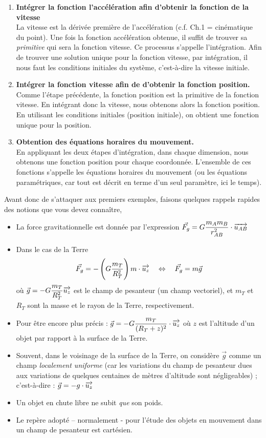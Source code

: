 \documentclass[11pt,a4paper]{article}
\begin{document}
\begin{mdframed}[backgroundcolor=blue!5]
\begin{enumerate}
    \item \textbf{Intégrer la fonction l'accélération afin d'obtenir la fonction de la vitesse}\\
    La vitesse est la dérivée première de l'accélération (c.f. Ch.1 = cinématique du point). Une fois la fonction accélération obtenue, il suffit de trouver sa \textit{primitive} qui sera la fonction vitesse. Ce processus s'appelle l'intégration. Afin de trouver une solution unique pour la fonction vitesse, par intégration, il nous faut les conditions initiales du système, c'est-à-dire la vitesse initiale. 
    \item \textbf{Intégrer la fonction vitesse afin de d'obtenir la fonction position.}\\
    Comme l'étape précédente, la fonction position est la primitive de la fonction vitesse. En intégrant donc la vitesse, nous obtenons alors la fonction position. En utilisant les conditions initiales (position initiale), on obtient une fonction unique pour la position. 
    \item \textbf{Obtention des équations horaires du mouvement. }\\
    En appliquant les deux étapes d'intégration, dans chaque dimension, nous obtenons une fonction position pour chaque coordonnée. L'ensemble de ces fonctions s'appelle les équations horaires du mouvement (ou les équations paramétriques, car tout est décrit en terme d'un seul paramètre, ici le temps).
\end{enumerate}
\end{mdframed}

Avant donc de s'attaquer aux premiers exemples, faisons quelques rappels rapides des notions que vous devez connaître, 
\begin{itemize}
    \item La force gravitationnelle est donnée par l'expression $\Vec{F_g} = G\dfrac{m_Am_B}{r_{AB}^2}\cdot \overrightarrow{u_{AB}}$
    \item Dans le cas de la Terre  
    \[\Vec{F_g} = -\left(G\dfrac{m_T}{R_{T}^2}\right)m\cdot\overrightarrow{u_{z}} \quad \Leftrightarrow \quad \Vec{F_g} = m\Vec{g} \]
    où $\Vec{g} = -G\dfrac{m_T}{R_{T}^2}\overrightarrow{u_{z}}$ est le champ de pesanteur (un champ vectoriel), et $m_T$ et $R_T$ sont la masse et le rayon de la Terre, respectivement. 
    \item Pour être encore plus précis : $\Vec{g} = -G\dfrac{m_T}{(R_{T} + z)^2}\cdot \overrightarrow{u_{z}}$  où $z$ est l’altitude d’un objet par rapport à la surface de la Terre. 
    \item 	Souvent, dans le voisinage de la surface de la Terre, on considère $\Vec{g}$  comme un champ \textit{localement uniforme} (car les variations du champ de pesanteur dues aux variations de quelques centaines de mètres d’altitude sont négligeables) ; c’est-à-dire : $\Vec{g} = -g\cdot\overrightarrow{u_{z}}$
    \item Un objet en chute libre ne subit \textit{que} son poids. 
    \item Le repère adopté – normalement - pour l’étude des objets en mouvement dans un champ de pesanteur est cartésien.
\end{itemize}
\end{document}
